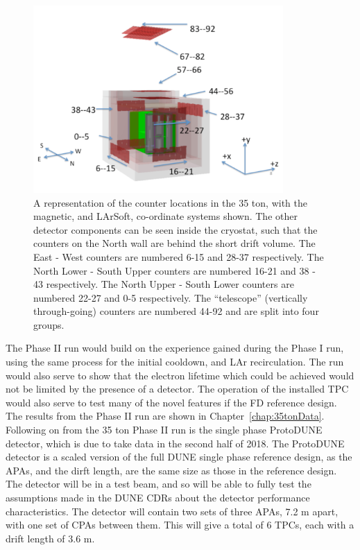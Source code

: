 \begin{figure}
  \centering
  \includegraphics[width=0.85\textwidth]{35tonFullDetect}
  \caption[A representation of the counter locations in the 35 ton]
          {A representation of the counter locations in the 35 ton, with the magnetic, and LArSoft, co-ordinate systems shown. The other detector components can be seen inside the cryostat, such that the counters on the North wall are behind the short drift volume. The East - West counters are numbered 6-15 and 28-37 respectively. The North Lower - South Upper counters are numbered 16-21 and 38 - 43 respectively. The North Upper - South Lower counters are numbered 22-27 and 0-5 respectively. The ``telescope'' (vertically through-going) counters are numbered 44-92 and are split into four groups.}
  \label{fig:35tonCounterLoc}
\end{figure}

The Phase II run would build on the experience gained during the Phase I run, using the same process for the initial cooldown, and LAr recirculation. The run would also serve to show that the electron lifetime which could be achieved would not be limited by the presence of a detector. The operation of the installed TPC would also serve to test many of the novel features if the FD reference design. The results from the Phase II run are shown in Chapter~\ref{chap:35tonData}. \\

Following on from the 35 ton Phase II run is the single phase ProtoDUNE detector, which is due to take data in the second half of 2018. The ProtoDUNE detector is a scaled version of the full DUNE single phase reference design, as the APAs, and the dirft length, are the same size as those in the reference design. The detector will be in a test beam, and so will be able to fully test the assumptions made in the DUNE CDRs about the detector performance characteristics. The detector will contain two sets of three APAs, 7.2 m apart, with one set of CPAs between them. This will give a total of 6 TPCs, each with a drift length of 3.6 m. \\

